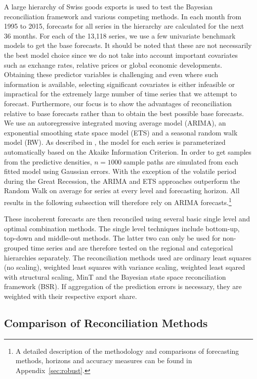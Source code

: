 \documentclass[a4paper,fleqn,11pt]{article}
\begin{document}
A large hierarchy of Swiss goods exports is used to test the Bayesian reconciliation framework and various competing methods. In each month from 1995 to 2015, forecasts for all series in the hierarchy are calculated for the next 36 months. For each of the 13,118 series, we use a few univariate benchmark models to get the base forecasts. It should be noted that these are not necessarily the best model choice since we do not take into account important covariates such as exchange rates, relative prices or global economic developments. Obtaining these predictor variables is challenging and even where such information is available, selecting significant covariates is either infeasible or impractical for the extremely large number of time series that we attempt to forecast. Furthermore, our focus is to show the advantages of reconciliation relative to base forecasts rather than to obtain the best possible base forecasts.  We use an autoregressive integrated moving average model (ARIMA), an exponential smoothing state space model (ETS) and a seasonal random walk model (RW). As described in \cite{Hyndman2008}, the model for each series is parameterized automatically based on the Akaike Information Criterion. In order to get samples from the predictive densities, $n = 1000$ sample paths are simulated from each fitted model using Gaussian errors. With the exception of the volatile period during the Great Recession, the ARIMA and ETS approaches outperform the Random Walk on average for series at every level and forecasting horizon. All results in the following subsection will therefore rely on ARIMA forecasts.\footnote{A detailed description of the methodology and comparisons of forecasting methods, horizons and accuracy measures can be found in Appendix~\ref{sec:robust}.}

These incoherent forecasts are then reconciled using several basic single level and optimal combination methods. The single level techniques include bottom-up, top-down and middle-out methods. The latter two can only be used for non-grouped time series and are therefore tested on the regional and categorical hierarchies separately. The reconciliation methods used are ordinary least squares (no scaling), weighted least squares with variance scaling, weighted least sqared with structural scaling, MinT and the Bayesian state space reconciliation framework (BSR). If aggregation of the prediction errors is necessary, they are weighted with their respective export share.


\subsection{Comparison of Reconciliation Methods}
\end{document}
